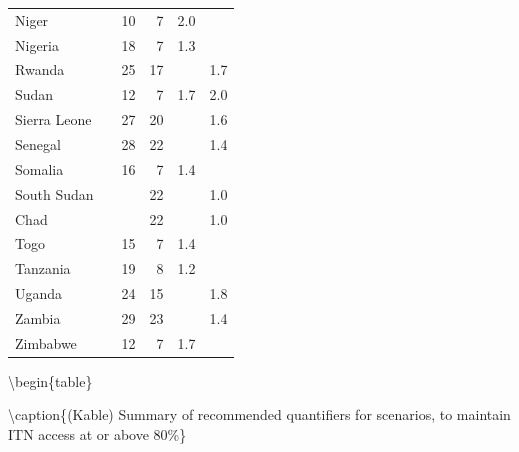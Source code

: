 \documentclass[review,
3p]{elsarticle} %
\begin{document}
\begin{longtable}{lcrrrr}
Niger &  & 10 & 7 & 2.0 &  \\ 
Nigeria &  & 18 & 7 & 1.3 &  \\ 
Rwanda &  & 25 & 17 &  & 1.7 \\ 
Sudan &  & 12 & 7 & 1.7 & 2.0 \\ 
Sierra Leone &  & 27 & 20 &  & 1.6 \\ 
Senegal &  & 28 & 22 &  & 1.4 \\ 
Somalia &  & 16 & 7 & 1.4 &  \\ 
South Sudan &  &  & 22 &  & 1.0 \\ 
Chad &  &  & 22 &  & 1.0 \\ 
Togo &  & 15 & 7 & 1.4 &  \\ 
Tanzania &  & 19 & 8 & 1.2 &  \\ 
Uganda &  & 24 & 15 &  & 1.8 \\ 
Zambia &  & 29 & 23 &  & 1.4 \\ 
Zimbabwe &  & 12 & 7 & 1.7 &  \\ 
\bottomrule
\end{longtable}

\textbackslash begin\{table\}

\textbackslash caption\{\label{tab:kable_table80}(Kable) Summary of
recommended quantifiers for scenarios, to maintain ITN access at or
above 80\%\} \centering
\end{document}
